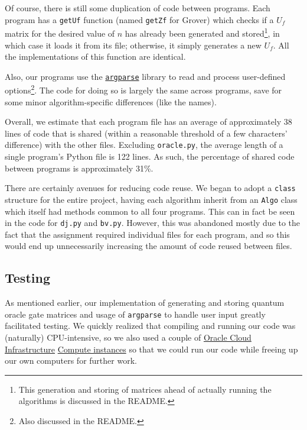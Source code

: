 \documentclass[12pt]{article}
\begin{document}
Of course, there is still some duplication of code between programs.
Each program has a \texttt{getUf} function (named \texttt{getZf} for Grover) which checks if a $U_f$ matrix for the desired value of $n$ has already been generated and stored\footnote{This generation and storing of matrices ahead of actually running the algorithms is discussed in the README.},
in which case it loads it from its file; otherwise, it simply generates a new $U_f$.
All the implementations of this function are identical.

Also, our programs use the \href{https://docs.python.org/3/library/argparse.html}{\texttt{argparse}} library \cite{python3} to read and process user-defined options\footnote{Also discussed in the README.}.
The code for doing so is largely the same across programs, save for some minor algorithm-specific differences (like the names).

Overall, we estimate that each program file has an average of approximately 38 lines of code that is shared (within a reasonable threshold of a few characters' difference) with the other files.
Excluding \texttt{oracle.py}, the average length of a single program's Python file is 122 lines.
As such, the percentage of shared code between programs is approximately 31\%.

There are certainly avenues for reducing code reuse.
We began to adopt a \texttt{class} structure for the entire project, having each algorithm inherit from an \texttt{Algo} class which itself had methods common to all four programs.
This can in fact be seen in the code for \texttt{dj.py} and \texttt{bv.py}.
However, this was abandoned mostly due to the fact that the assignment required individual files for each program, and so this would end up unnecessarily increasing the amount of code reused between files.

\subsection{Testing}

As mentioned earlier, our implementation of generating and storing quantum oracle gate matrices and usage of \texttt{argparse} to handle user input greatly facilitated testing.
We quickly realized that compiling and running our code was (naturally) CPU-intensive, so we also used a couple of \href{https://www.oracle.com/cloud/}{Oracle Cloud Infrastructure} \href{https://www.oracle.com/cloud/compute/}{Compute instances} so that we could run our code while freeing up our own computers for further work.
\end{document}

